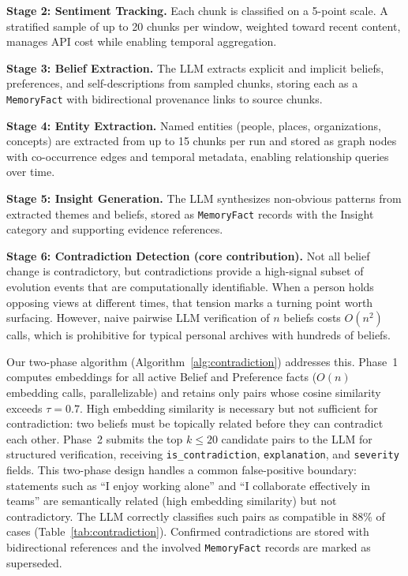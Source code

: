 \documentclass[conference]{IEEEtran}
\begin{document}
\textbf{Stage 2: Sentiment Tracking.} Each chunk is classified on a 5-point scale. A stratified sample of up to 20 chunks per window, weighted toward recent content, manages API cost while enabling temporal aggregation.

\textbf{Stage 3: Belief Extraction.} The LLM extracts explicit and implicit beliefs, preferences, and self-descriptions from sampled chunks, storing each as a \texttt{MemoryFact} with bidirectional provenance links to source chunks.

\textbf{Stage 4: Entity Extraction.} Named entities (people, places, organizations, concepts) are extracted from up to 15 chunks per run and stored as graph nodes with co-occurrence edges and temporal metadata, enabling relationship queries over time.

\textbf{Stage 5: Insight Generation.} The LLM synthesizes non-obvious patterns from extracted themes and beliefs, stored as \texttt{MemoryFact} records with the Insight category and supporting evidence references.

\textbf{Stage 6: Contradiction Detection (core contribution).}
Not all belief change is contradictory, but contradictions provide a high-signal subset of evolution events that are computationally identifiable. When a person holds opposing views at different times, that tension marks a turning point worth surfacing. However, naive pairwise LLM verification of $n$ beliefs costs $O(n^2)$ calls, which is prohibitive for typical personal archives with hundreds of beliefs.

Our two-phase algorithm (Algorithm~\ref{alg:contradiction}) addresses this. Phase~1 computes embeddings for all active Belief and Preference facts ($O(n)$ embedding calls, parallelizable) and retains only pairs whose cosine similarity exceeds $\tau{=}0.7$. High embedding similarity is necessary but not sufficient for contradiction: two beliefs must be topically related before they can contradict each other. Phase~2 submits the top $k \leq 20$ candidate pairs to the LLM for structured verification, receiving \texttt{is\_contradiction}, \texttt{explanation}, and \texttt{severity} fields. This two-phase design handles a common false-positive boundary: statements such as ``I enjoy working alone'' and ``I collaborate effectively in teams'' are semantically related (high embedding similarity) but not contradictory. The LLM correctly classifies such pairs as compatible in 88\% of cases (Table~\ref{tab:contradiction}). Confirmed contradictions are stored with bidirectional references and the involved \texttt{MemoryFact} records are marked as superseded.
\end{document}
